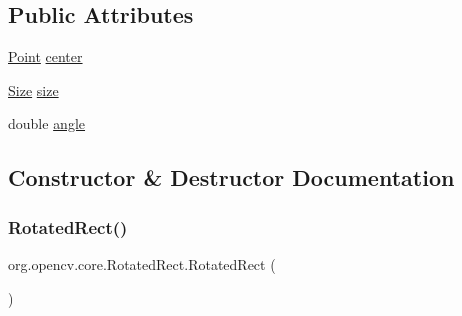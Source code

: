 \subsection*{Public Attributes}
\begin{DoxyCompactItemize}
\item 
\mbox{\hyperlink{classorg_1_1opencv_1_1core_1_1_point}{Point}} \mbox{\hyperlink{classorg_1_1opencv_1_1core_1_1_rotated_rect_a9b6d8b2a08d1515d080c8283474a18bf}{center}}
\item 
\mbox{\hyperlink{classorg_1_1opencv_1_1core_1_1_size}{Size}} \mbox{\hyperlink{classorg_1_1opencv_1_1core_1_1_rotated_rect_aaac2295db68b34236de8a80dd3f4cb2f}{size}}
\item 
double \mbox{\hyperlink{classorg_1_1opencv_1_1core_1_1_rotated_rect_a9731b489a55e7a8020b203d3e4784178}{angle}}
\end{DoxyCompactItemize}


\subsection{Constructor \& Destructor Documentation}
\mbox{\label{classorg_1_1opencv_1_1core_1_1_rotated_rect_afe2e2e5d1b21f8c1fcf1510972e4a9f8}} 
\subsubsection{\texorpdfstring{Rotated\+Rect()}{RotatedRect()}\hspace{0.1cm}{\footnotesize\ttfamily [1/3]}}
{\footnotesize\ttfamily org.\+opencv.\+core.\+Rotated\+Rect.\+Rotated\+Rect (\begin{DoxyParamCaption}{ }\end{DoxyParamCaption})}

\mbox{\label{classorg_1_1opencv_1_1core_1_1_rotated_rect_ac9f4486cf440e08b3908adb82c918f3d}} 
